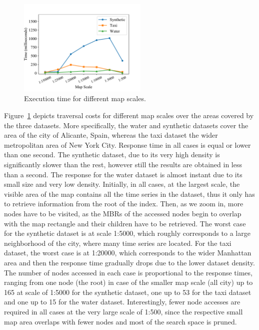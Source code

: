 \begin{figure}[!tb]
 \centering
 \includegraphics[width=0.55\textwidth]{figures/BTSR_zoom.pdf}
 \caption{Execution time for different map scales.}
 \label{fig:btsr_zoom}
\end{figure}


Figure~\ref{fig:btsr_zoom} depicts traversal costs for different map scales over the areas covered by the three datasets. More specifically, the water and synthetic datasets cover the area of the city of Alicante, Spain, whereas the taxi dataset the wider metropolitan area of New York City. Response time in all cases is equal or lower than one second. The synthetic dataset, due to its very high density is significantly slower than the rest, however still the results are obtained in less than a second. The response for the water dataset is almost instant due to its small size and very low density. Initially, in all cases, at the largest scale, the visible area of the map contains all the time series in the dataset, thus it only has to retrieve information from the root of the index. Then, as we zoom in, more nodes have to be visited, as the MBRs of the accessed nodes begin to overlap with the map rectangle and their children have to be retrieved. The worst case for the synthetic dataset is at scale 1:5000, which roughly corresponds to a large neighborhood of the city, where many time series are located. For the taxi dataset, the worst case is at 1:20000, which corresponds to the wider Manhattan area and then the response time gradually drops due to the lower dataset density. The number of nodes accessed in each case is proportional to the response times, ranging from one node (the root) in case of the smaller map scale (all city) up to 165 at scale of 1:5000 for the synthetic dataset, one up to 53 for the taxi dataset and one up to 15 for the water dataset. Interestingly, fewer node accesses are required in all cases at the very large scale of 1:500, since the respective small map area overlaps with fewer nodes and most of the search space is pruned. 


